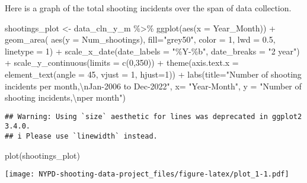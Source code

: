 \documentclass[
]{article}
\newenvironment{Shaded}{\begin{snugshade}}{\end{snugshade}}
\newcommand{\AttributeTok}[1]{\textcolor[rgb]{0.77,0.63,0.00}{#1}}
\newcommand{\DecValTok}[1]{\textcolor[rgb]{0.00,0.00,0.81}{#1}}
\newcommand{\FloatTok}[1]{\textcolor[rgb]{0.00,0.00,0.81}{#1}}
\newcommand{\FunctionTok}[1]{\textcolor[rgb]{0.00,0.00,0.00}{#1}}
\newcommand{\NormalTok}[1]{#1}
\newcommand{\OtherTok}[1]{\textcolor[rgb]{0.56,0.35,0.01}{#1}}
\newcommand{\SpecialCharTok}[1]{\textcolor[rgb]{0.00,0.00,0.00}{#1}}
\newcommand{\StringTok}[1]{\textcolor[rgb]{0.31,0.60,0.02}{#1}}
\begin{document}
Here is a graph of the total shooting incidents over the span of data
collection.

\begin{Shaded}
\begin{Highlighting}[]
\NormalTok{shootings\_plot }\OtherTok{\textless{}{-}}\NormalTok{ data\_cln\_y\_m }\SpecialCharTok{\%\textgreater{}\%} \FunctionTok{ggplot}\NormalTok{(}\FunctionTok{aes}\NormalTok{(}\AttributeTok{x =}\NormalTok{ Year\_Month)) }\SpecialCharTok{+} \FunctionTok{geom\_area}\NormalTok{( }\FunctionTok{aes}\NormalTok{(}\AttributeTok{y =}\NormalTok{ Num\_shootings), }\AttributeTok{fill=}\StringTok{"grey50"}\NormalTok{, }\AttributeTok{color =} \DecValTok{1}\NormalTok{, }\AttributeTok{lwd =} \FloatTok{0.5}\NormalTok{, }\AttributeTok{linetype =} \DecValTok{1}\NormalTok{) }\SpecialCharTok{+} \FunctionTok{scale\_x\_date}\NormalTok{(}\AttributeTok{date\_labels =} \StringTok{"\%Y{-}\%b"}\NormalTok{, }\AttributeTok{date\_breaks =} \StringTok{"2 year"}\NormalTok{) }\SpecialCharTok{+} \FunctionTok{scale\_y\_continuous}\NormalTok{(}\AttributeTok{limits =} \FunctionTok{c}\NormalTok{(}\DecValTok{0}\NormalTok{,}\DecValTok{350}\NormalTok{)) }\SpecialCharTok{+} \FunctionTok{theme}\NormalTok{(}\AttributeTok{axis.text.x =} \FunctionTok{element\_text}\NormalTok{(}\AttributeTok{angle =} \DecValTok{45}\NormalTok{, }\AttributeTok{vjust =} \DecValTok{1}\NormalTok{, }\AttributeTok{hjust=}\DecValTok{1}\NormalTok{)) }\SpecialCharTok{+} \FunctionTok{labs}\NormalTok{(}\AttributeTok{title=}\StringTok{"Number of shooting incidents per month,}\SpecialCharTok{\textbackslash{}n}\StringTok{Jan{-}2006 to Dec{-}2022"}\NormalTok{, }\AttributeTok{x=} \StringTok{"Year{-}Month"}\NormalTok{, }\AttributeTok{y =} \StringTok{"Number of shooting incidents,}\SpecialCharTok{\textbackslash{}n}\StringTok{per month"}\NormalTok{)}
\end{Highlighting}
\end{Shaded}

\begin{verbatim}
## Warning: Using `size` aesthetic for lines was deprecated in ggplot2 3.4.0.
## i Please use `linewidth` instead.
\end{verbatim}

\begin{Shaded}
\begin{Highlighting}[]
\FunctionTok{plot}\NormalTok{(shootings\_plot)}
\end{Highlighting}
\end{Shaded}

\texttt{[image: NYPD-shooting-data-project\_files/figure-latex/plot\_1-1.pdf]}
\end{document}
